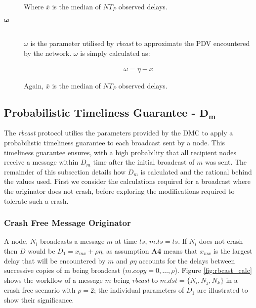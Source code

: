 \begin{description}
Where $\bar{x}$ is the median of $NT_P$ observed delays.

        \item[\Huge$\boldsymbol{\omega}$] \hfill \\
        $\omega$ is the parameter utilised by \emph{rbcast} to approximate the PDV encountered by the network.  $\omega$ is simply calculated as:
        
        \begin{equation*}
		    \begin{aligned}
		        \omega = \eta - \bar{x}
		    \end{aligned}
		\end{equation*}        
        
        Again, $\bar{x}$ is the median of $NT_P$ observed delays.
        \end{description}

        \subsection*{Probabilistic Timeliness Guarantee - $\boldsymbol{D_m}$}
        The \emph{rbcast} protocol utilies the parameters provided by the DMC to apply a probabilistic timeliness guarantee to each broadcast sent by a node.  This timeliness guarantee ensures, with a high probability that all recipient nodes receive a message within $D_m$ time after the initial broadcast of $m$ was sent.  The remainder of this subsection details how $D_m$ is calculated and the rational behind the values used.  First we consider the calculations required for a broadcast where the originator does not crash, before exploring the modifications required to tolerate such a crash.  

        \subsubsection*{Crash Free Message Originator}
        A node, $N_i$ broadcasts a message $m$ at time $ts$, $m.ts = ts$.  If $N_i$ does not crash then $D$ would be $D_1 = x_{mx} + \rho\eta$, as assumption \textbf{A4} means that $x_{mx}$ is the largest delay that will be encountered by $m$ and $\rho\eta$ accounts for the delays between successive copies of m being broadcast ($m.copy = 0,\ldots,\rho$).  Figure \ref{fig:rbcast_calc} shows the workflow of a message $m$ being \emph{rbcast} to $m.dst = \{N_i, N_j, N_k\}$ in a crash free scenario with $\rho = 2$; the individual parameters of $D_1$ are illustrated to show their significance.  
        
